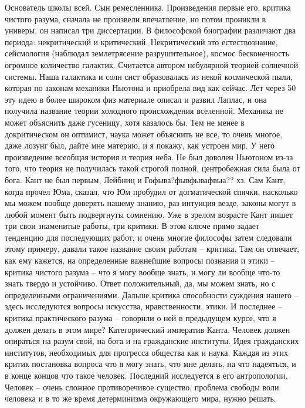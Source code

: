 \documentclass[a4paper, 12pt]{article}
\begin{document}
Основатель школы всей. Сын ремесленника. Произведения первые его, 
критика чистого разума, сначала не произвели впечатление, но потом 
проникли в универы, он написал три диссертации. В философской биографии 
различают два периода: некритический и критический. Некритический это 
естествознание, сейсмология (наблюдал землетрясение разрушительное), 
космос бесконечность огромное количество галактик. Считается автором 
небулярной теорией солнечной системы. Наша галактика и солн сист 
образовалась из некой космической пыли, которая по законам механики 
Ньютона и приобрела вид как сейчас. Лет через 50 эту идею в более 
широком физ материале описал и развил Лаплас, и она получила название 
теории холодного происхождения вселенной. Механика не может объяснить 
даже гусеницу, хотя казалось бы. Тем не менее в докритическом он 
оптимист, наука может объяснить не все, то очень многое, даже лозунг 
был, дайте мне материю, и я покажу, как устроен мир. У него произведение 
всеобщая история и теория неба. Не был доволен Ньютоном из-за того, что 
теория не получилась такой строгой полной, центробежная сила была от 
бога. Кант не был первым, Лейбниц и Гофыва?фывфывафвыа?? хз. Сам Кант, 
когда прочел Юма, сказал, что Юм пробудил от догматической спячки, 
насколько мы можем вообще доверять нашему знанию, раз интуиция везде, 
законы могут в любой момент быть подвергнуты сомнению. Уже в зрелом 
возрасте Кант пишет три свои знаменитые работы, три критики. В этом 
ключе прямо задает тенденцию для последующих работ, и очень многие 
философы затем следовали этому примеру, давали такое название своим 
работам -- критика. Там он отвечает, как ему кажется, на определенные 
важнейшие вопросы познания и этики -- критика чистого разума -- что 
я могу вообще знать, и могу ли вообще что-то знать твердо и устойчиво. 
Ответ положительный, да, мы можем знать, но с определенными 
ограничениями. Дальше критика способности суждения нашего -- здесь 
исследуются вопросы искусства, нравственности, этики. И последнее -- 
критика практического разума -- говорили о ней в предыдущем курсе, что 
я должен делать в этом мире? Категорический императив Канта. Человек 
должен опираться на разум свой, на бога и на гражданские институты. Идея 
гражданских институтов, необходимых для прогресса общества как и наука. 
Каждая из этих критик постановка вопроса что я могу знать, что мне 
делать, на что надеяться, и в конце концов что такое человек. Последний 
исследуется в его антропологии. Человек -- очень сложное противоречивое 
существо, проблема свободы воли человека и в то же время детерминизма 
окружающего мира, нужно решать.
\end{document}
